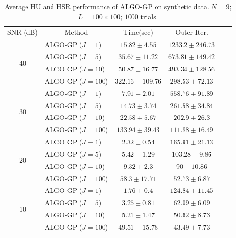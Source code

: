 \begin{table}[h]
\begin{adjustbox}{max width=\textwidth}
\begin{tabular}{|c|l|c|c|c|c|}
\cline{1-4}
SNR (dB)            & \multicolumn{1}{c|}{Method}& Time(sec)             & Outer Iter.           \tabularnewline \cline{1-4}
\multirow{4}{*}{40} & ALGO-GP ($J=1$)            & $15.82    \pm 4.55$   & $1233.2   \pm 246.73$ \tabularnewline
                    & ALGO-GP ($J=5$)            & $35.67    \pm 11.22$  & $673.81   \pm 149.42$ \tabularnewline
                    & ALGO-GP ($J=10$)           & $50.87    \pm 16.77$  & $493.34   \pm 128.56$ \tabularnewline
                    & ALGO-GP ($J=100$)          & $322.16   \pm 109.76$ & $298.53   \pm 72.13$  \tabularnewline \cline{1-4}
\multirow{4}{*}{30} & ALGO-GP ($J=1$)            & $7.91     \pm 2.01$   & $558.76   \pm 91.89$  \tabularnewline
                    & ALGO-GP ($J=5$)            & $14.73    \pm 3.74$   & $261.58   \pm 34.84$  \tabularnewline
                    & ALGO-GP ($J=10$)           & $22.58    \pm 5.67$   & $202.9    \pm 26.3$   \tabularnewline
                    & ALGO-GP ($J=100$)          & $133.94   \pm 39.43$  & $111.88   \pm 16.49$  \tabularnewline \cline{1-4}
\multirow{4}{*}{20} & ALGO-GP ($J=1$)            & $2.32     \pm 0.54$   & $165.91   \pm 21.13$  \tabularnewline
                    & ALGO-GP ($J=5$)            & $5.42     \pm 1.29$   & $103.28   \pm 9.86$   \tabularnewline
                    & ALGO-GP ($J=10$)           & $9.32     \pm 2.3$    & $90       \pm 10.86$  \tabularnewline
                    & ALGO-GP ($J=100$)          & $58.3     \pm 17.71$  & $52.73    \pm 6.87$   \tabularnewline \cline{1-4}
\multirow{4}{*}{10} & ALGO-GP ($J=1$)            & $1.76     \pm 0.4$    & $124.84   \pm 11.45$  \tabularnewline
                    & ALGO-GP ($J=5$)            & $3.26     \pm 0.81$   & $62.09    \pm 6.09$   \tabularnewline
                    & ALGO-GP ($J=10$)           & $5.21     \pm 1.47$   & $50.62    \pm 8.73$   \tabularnewline
                    & ALGO-GP ($J=100$)          & $49.51    \pm 15.78$  & $43.49    \pm 7.73$   \tabularnewline \cline{1-4}
\end{tabular}
\end{adjustbox}
\caption{Average HU and HSR performance of ALGO-GP on synthetic data.
         $N = 9$; $L = 100 \times 100$; $1000$ trials.}
\label{table:results_full_GP_MO9}
\end{table}


